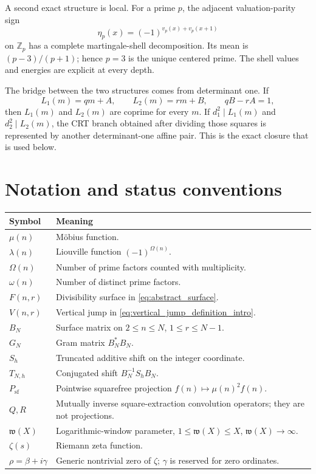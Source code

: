 \documentclass[11pt]{amsart}
\numberwithin{equation}{section}
\theoremstyle{plain}
\theoremstyle{definition}
\theoremstyle{remark}
\newcommand{\Z}{\mathbb Z}
\newcommand{\mob}{\mu}
\newcommand{\liou}{\lambda}
\newcommand{\Fsurf}{F}
\newcommand{\Vjump}{V}
\newcommand{\what}{\mathfrak w}
\begin{document}
A second exact structure is local.  For a prime $p$, the adjacent valuation-parity sign
\begin{equation}
\eta_p(x)=(-1)^{v_p(x)+v_p(x+1)}
\label{eq:eta_preview}
\end{equation}
on $\Z_p$ has a complete martingale-shell decomposition.  Its mean is $(p-3)/(p+1)$; hence $p=3$ is the unique centered prime.  The shell values and energies are explicit at every depth.

The bridge between the two structures comes from determinant one.  If
\begin{equation}
L_1(m)=qm+A,
\qquad
L_2(m)=rm+B,
\qquad
qB-rA=1,
\label{eq:unimodular_pair_preview}
\end{equation}
then $L_1(m)$ and $L_2(m)$ are coprime for every $m$.  If $d_1^2\mid L_1(m)$ and $d_2^2\mid L_2(m)$, the CRT branch obtained after dividing those squares is represented by another determinant-one affine pair.  This is the exact closure that is used below.

\section{Notation and status conventions}
\label{sec:notation}

\begin{center}
\begin{tabular}{>{\raggedright\arraybackslash}p{} >{\raggedright\arraybackslash}p{}}
\toprule
Symbol & Meaning\\
\midrule
$\mob(n)$ & Möbius function.\\
$\liou(n)$ & Liouville function $(-1)^{\Omega(n)}$.\\
$\Omega(n)$ & Number of prime factors counted with multiplicity.\\
$\omega(n)$ & Number of distinct prime factors.\\
$\Fsurf(n,r)$ & Divisibility surface in \eqref{eq:abstract_surface}.\\
$\Vjump(n,r)$ & Vertical jump in \eqref{eq:vertical_jump_definition_intro}.\\
$B_N$ & Surface matrix on $2\le n\le N$, $1\le r\le N-1$.\\
$G_N$ & Gram matrix $B_N^*B_N$.\\
$S_h$ & Truncated additive shift on the integer coordinate.\\
$T_{N,h}$ & Conjugated shift $B_N^{-1}S_hB_N$.\\
$P_{\mathrm{sf}}$ & Pointwise squarefree projection $f(n)\mapsto\mob(n)^2f(n)$.\\
$Q,R$ & Mutually inverse square-extraction convolution operators; they are not projections.\\
$\what(X)$ & Logarithmic-window parameter, $1\le\what(X)\le X$, $\what(X)\to\infty$.\\
$\zeta(s)$ & Riemann zeta function.\\
$\rho=\beta+i\gamma$ & Generic nontrivial zero of $\zeta$; $\gamma$ is reserved for zero ordinates.\\
\bottomrule
\end{tabular}
\end{center}
\end{document}
